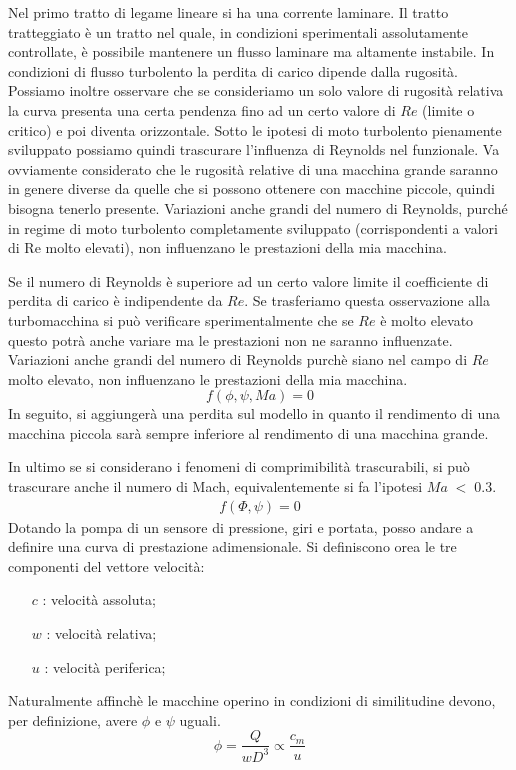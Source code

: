 Nel primo tratto di legame lineare si ha una corrente laminare. Il tratto tratteggiato è un tratto nel quale, in condizioni sperimentali assolutamente controllate, è possibile mantenere un flusso laminare ma altamente instabile. In condizioni di flusso turbolento la perdita di carico dipende dalla rugosità.
Possiamo inoltre osservare che se consideriamo un solo valore di rugosità relativa la curva presenta una certa pendenza fino ad un certo valore di $Re$ (limite o critico) e poi diventa orizzontale. Sotto le ipotesi di moto turbolento pienamente sviluppato possiamo quindi trascurare l’influenza di Reynolds nel funzionale. Va ovviamente considerato che le rugosità relative di una macchina grande saranno in genere diverse da quelle che si possono ottenere con macchine piccole, quindi bisogna tenerlo presente. Variazioni anche grandi del numero di Reynolds, purché in regime di moto turbolento completamente sviluppato (corrispondenti a valori di Re molto elevati), non influenzano le prestazioni della mia macchina.

Se il numero di Reynolds è superiore ad un certo valore limite il coefficiente di perdita di carico è indipendente da $Re$. Se trasferiamo questa osservazione alla turbomacchina si può verificare sperimentalmente che se $Re$ è molto elevato questo potrà anche variare ma le prestazioni non ne saranno influenzate. Variazioni anche grandi del numero di Reynolds purchè siano nel
campo di $Re$ molto elevato, non influenzano le prestazioni della mia macchina.
\begin{equation}
f(\phi,\psi,Ma)=0
\end{equation}
In seguito, si aggiungerà una perdita sul modello in quanto il rendimento di una macchina piccola sarà sempre inferiore al rendimento di una macchina grande.

In ultimo se si considerano i fenomeni di comprimibilità trascurabili, si può trascurare anche il numero di Mach, equivalentemente si fa l'ipotesi $Ma\;<\;0.3$.
\begin{align*}
f(\Phi,\psi)=0
\end{align*}
Dotando la pompa di un sensore di pressione, giri e portata, posso andare a definire una curva di prestazione adimensionale.
Si definiscono orea le tre componenti del vettore velocità:
\begin{itemize}
\item[$c$]: velocità assoluta;
\item[$w$]: velocità relativa;
\item[$u$]: velocità periferica;
\end{itemize}
Naturalmente affinchè le macchine operino in condizioni di similitudine devono, per definizione, avere $\phi$ e $\psi$ uguali. 
\begin{equation}
\phi=\frac{Q}{w D^3} \propto \frac{c_m}{u}
\end{equation}

